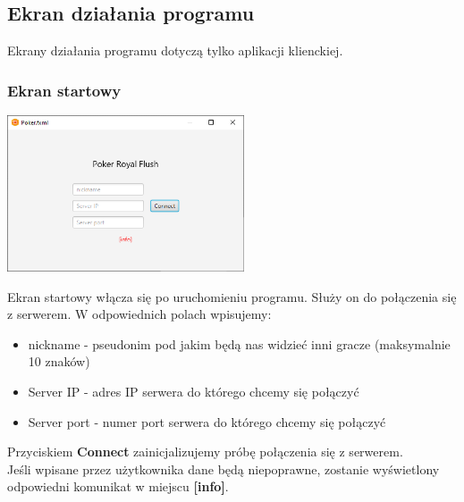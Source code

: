 \documentclass{article}
\begin{document}
    \subsection{Ekran działania programu}
        Ekrany działania programu dotyczą tylko aplikacji klienckiej.
        \subsubsection{Ekran startowy}
            \begin{center}
                \includegraphics[width=70mm]{gui_start.png}
            \end{center}
            Ekran startowy włącza się po uruchomieniu programu. Służy on do połączenia się z serwerem.
            W odpowiednich polach wpisujemy:
            \begin{itemize}
                \item nickname - pseudonim pod jakim będą nas widzieć inni gracze (maksymalnie 10 znaków)
                \item Server IP - adres IP serwera do którego chcemy się połączyć
                \item Server port - numer port serwera do którego chcemy się połączyć
            \end{itemize}
            Przyciskiem \textbf{Connect} zainicjalizujemy próbę połączenia się z serwerem.\\
            Jeśli wpisane przez użytkownika dane będą niepoprawne, zostanie wyświetlony odpowiedni komunikat w miejscu \textbf{[info]}.
            
\end{document}
